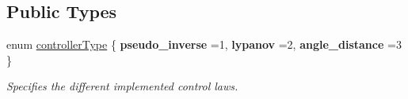 \subsection*{Public Types}
\begin{DoxyCompactItemize}
\item 
enum \hyperlink{classController_a86221d052db839985bd6e4d73013cd06}{controller\+Type} \{ {\bfseries pseudo\+\_\+inverse} =1, 
{\bfseries lypanov} =2, 
{\bfseries angle\+\_\+distance} =3
 \}\hypertarget{classController_a86221d052db839985bd6e4d73013cd06}{}\label{classController_a86221d052db839985bd6e4d73013cd06}
\begin{DoxyCompactList}\small\item\em Specifies the different implemented control laws. \end{DoxyCompactList}
\end{DoxyCompactItemize}
